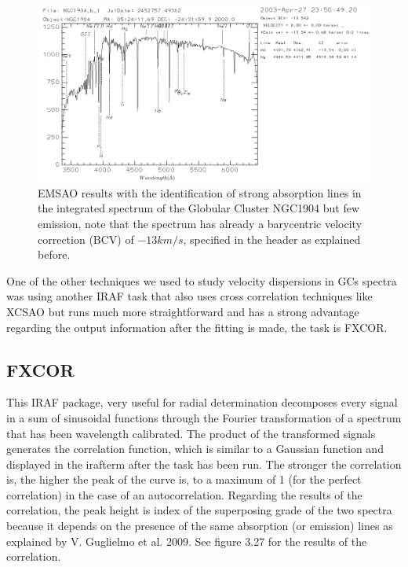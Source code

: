\begin{figure}[H]
\centering
\includegraphics[width=13cm]{images/emsao.png}
\caption[EMSAO results with the identification of lines]{EMSAO results with the identification of strong absorption lines in the integrated spectrum of the Globular Cluster NGC1904 but few emission, note that the spectrum has already a barycentric velocity correction (BCV) of $-13km/s$, specified in the header as explained before.}
\end{figure}

One of the other techniques we used to study velocity dispersions in GCs spectra was using another IRAF task that also uses cross correlation techniques like XCSAO but runs much more straightforward and has a strong advantage regarding the output information after the fitting is made, the task is FXCOR. 

\subsection{FXCOR}

This IRAF package, very useful for radial determination decomposes every signal in a sum of sinusoidal functions through the Fourier transformation of a spectrum that has been wavelength calibrated. The product of the transformed signals generates the correlation function, which is similar to a Gaussian function and displayed in the irafterm after the task has been run. The stronger the correlation is, the higher the peak of the curve is, to a maximum of 1 (for the perfect correlation) in the case of an autocorrelation. Regarding the results of the correlation, the peak height is index of the superposing grade of the two spectra because it depends on the presence of the same absorption (or emission) lines as explained by V. Guglielmo et al. 2009.  See figure 3.27 for the results of the correlation.

